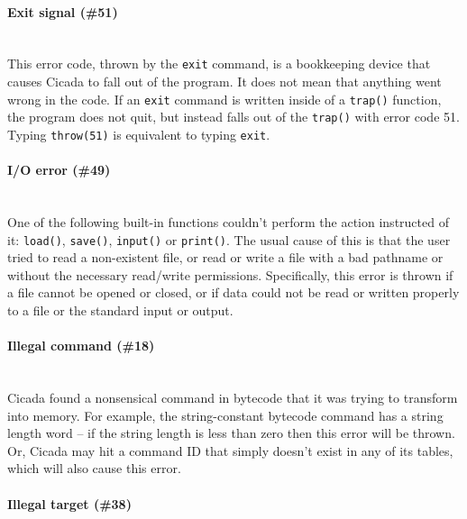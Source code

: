 \documentclass{article}
\begin{document}
\paragraph{Exit signal (\#51)\\\\}

This error code, thrown by the \verb#exit# command, is a bookkeeping device that causes Cicada to fall out of the program.  It does not mean that anything went wrong in the code.  If an \verb#exit# command is written inside of a \verb#trap()# function, the program does not quit, but instead falls out of the \verb#trap()# with error code 51.  Typing \verb#throw(51)# is equivalent to typing \verb#exit#.




\paragraph{I/O error (\#49)\\\\}

One of the following built-in functions couldn't perform the action instructed of it:  \verb#load()#, \verb#save()#, \verb#input()# or \verb#print()#.  The usual cause of this is that the user tried to read a non-existent file, or read or write a file with a bad pathname or without the necessary read/write permissions.  Specifically, this error is thrown if a file cannot be opened or closed, or if data could not be read or written properly to a file or the standard input or output.\\




\paragraph{Illegal command (\#18)\\\\}

Cicada found a nonsensical command in bytecode that it was trying to transform into memory.  For example, the string-constant bytecode command has a string length word -- if the string length is less than zero then this error will be thrown.  Or, Cicada may hit a command ID that simply doesn't exist in any of its tables, which will also cause this error.\\




\paragraph{Illegal target (\#38)\\\\}
\end{document}
